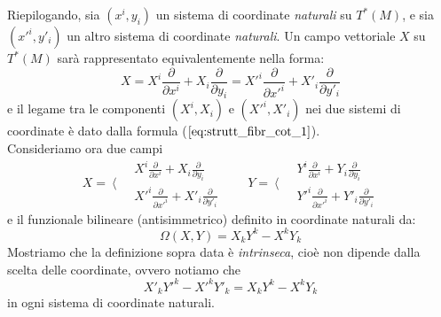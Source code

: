 Riepilogando, sia $ (x^i, y_i) $ un sistema di coordinate \textit{naturali} su $T^*(M)$, e sia $ (x'^i, y'_i) $ un altro sistema di coordinate \textit{naturali}. Un campo vettoriale $X$ su $T^*(M)$ sarà rappresentato equivalentemente nella forma:
\begin{equation*}
X = X^i \frac{\partial}{\partial x^i} + X_i\frac{\partial}{\partial y_i} = X'^i\frac{\partial}{\partial x'^i} + X'_i\frac{\partial}{\partial y'_i}
\end{equation*}
e il legame tra le componenti $(X^i,X_i)$ e $(X'^i,X'_i)$ nei due sistemi di coordinate è dato dalla formula ($ \ref{eq:strutt_fibr_cot_1} $).\\
Consideriamo ora due campi
\begin{equation*}
\left.X=~\bigg\langle~
\begin{aligned} 
&X^i \frac{\partial}{\partial x^i} + X_i\frac{\partial}{\partial y_i} \\
&X'^i\frac{\partial}{\partial x'^i} + X'_i\frac{\partial}{\partial y'_i}
\end{aligned}
\qquad
\right.Y=~\bigg\langle~
\begin{aligned} 
&Y^i \frac{\partial}{\partial x^i} + Y_i\frac{\partial}{\partial y_i} \\
&Y'^i\frac{\partial}{\partial x'^i} + Y'_i\frac{\partial}{\partial y'_i}
\end{aligned}
\end{equation*}
e il funzionale bilineare (antisimmetrico) definito in coordinate naturali da:
\begin{equation*}
\Omega(X,Y) = X_kY^k - X^kY_k
\end{equation*} 
Mostriamo che la definizione sopra data è \textit{intrinseca}, cioè non dipende dalla scelta delle coordinate, ovvero notiamo che \label{pag:7b_fibr_cot}
\begin{equation*}
X'_kY'^k - X'^kY'_k = X_kY^k - X^kY_k
\end{equation*}
in ogni sistema di coordinate naturali.
